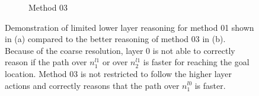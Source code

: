 \begin{figure}
\begin{subfigure}[b]{0.49\textwidth}
        \caption{Method 03}
        \label{subfig:problem2_M3}
    \end{subfigure}
    \caption{Demonstration of limited lower layer reasoning for method 01 shown in (a) compared to the better reasoning of method 03 in (b). Because of the coarse resolution, layer 0 is not able to correctly reason if the path over $n_1^{l1}$ or over $n_2^{l1}$ is faster for reaching the goal location. Method 03 is not restricted to follow the higher layer actions and correctly reasons that the path over $n_1^{l0}$ is faster.}
    \label{fig:M1_prob02}
\end{figure}
